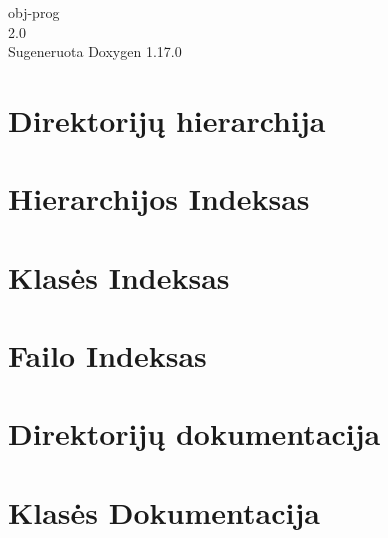 \documentclass[twoside]{book}
\newcommand{\+}{\discretionary{\mbox{\scriptsize$\hookleftarrow$}}{}{}}
\newcommand{\clearemptydoublepage}{%
    \newpage{\pagestyle{empty}\cleardoublepage}%
  }
\begin{document}
  \raggedbottom
    \hypersetup{pageanchor=false,
                bookmarksnumbered=true,
                pdfencoding=unicode
               }
  \begin{titlepage}
  \vspace*{7cm}
  \begin{center}%
  {\Large obj-\/prog}\\
  [1ex]\large 2.\+0 \\
  \vspace*{1cm}
  {\large Sugeneruota Doxygen 1.17.0}\\
  \end{center}
  \end{titlepage}
  \clearemptydoublepage
  \tableofcontents
  \clearemptydoublepage
  \hypersetup{pageanchor=true}

\chapter{Direktorijų hierarchija}

\chapter{Hierarchijos Indeksas}

\chapter{Klasės Indeksas}

\chapter{Failo Indeksas}

\chapter{Direktorijų dokumentacija}

\chapter{Klasės Dokumentacija}




\end{document}
